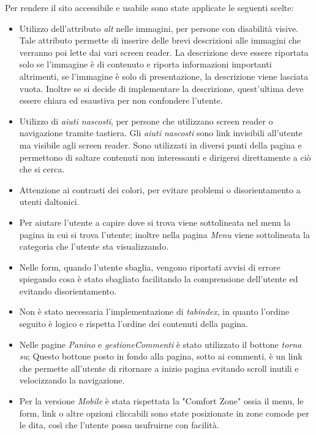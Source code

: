 Per rendere il sito accessibile e usabile sono state applicate le seguenti scelte: 
	\begin{itemize}
		\item Utilizzo dell'attributo \emph{alt} nelle immagini, per persone con disabilità visive.
		 Tale attributo permette di inserire delle brevi descrizioni alle immagini che verranno poi lette dai vari screen reader. 
		 La descrizione deve essere riportata solo se l'immagine è di contenuto e riporta informazioni importanti altrimenti, se l'immagine è solo di presentazione, la descrizione viene lasciata vuota.
		 Inoltre se si decide di implementare la descrizione, quest'ultima deve essere chiara ed esaustiva per non confondere l'utente.
		\item Utilizzo di \emph{aiuti nascosti}, per persone che utilizzano screen reader o navigazione tramite tastiera. 
		Gli \emph{aiuti nascosti} sono link invisibili all'utente ma visibile agli screen reader.
		 Sono utilizzati in diversi punti della pagina e permettono di saltare contenuti non interessanti e dirigersi direttamente a ciò che si cerca.
		\item Attenzione ai contrasti dei colori, per evitare problemi o disorientamento a utenti daltonici. 
		\item Per aiutare l'utente a capire dove si trova viene sottolineata nel menu la pagina in cui si trova l'utente; inoltre nella pagina \emph{Menu} viene sottolineata la categoria che l'utente sta visualizzando.
		\item Nelle form, quando l'utente sbaglia, vengono riportati avvisi di errore spiegando cosa è stato sbagliato facilitando la comprensione dell'utente ed evitando disorientamento.
		\item Non è stato necessaria l'implementazione di \emph{tabindex}, in quanto l'ordine seguito è logico e rispetta l'ordine dei contenuti della pagina.
		\item Nelle pagine \emph{Panino} e \emph{gestioneCommenti} è stato utilizzato il bottone \emph{torna su}; Questo bottone posto in fondo alla pagina, sotto ai commenti, è un link che permette all'utente di ritornare a inizio pagina evitando scroll inutili e velocizzando la navigazione. 
		\item Per la versione \emph{Mobile} è stata rispettata la "Comfort Zone" ossia il menu, le form, link o altre opzioni cliccabili sono state posizionate in zone comode per le dita, così che l'utente possa usufruirne con facilità. 
	\end{itemize}